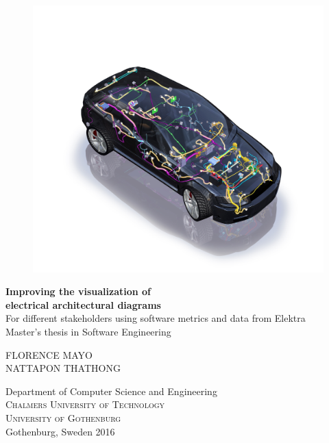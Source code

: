 
\begin{titlepage}
			
\addtolength{\voffset}{2cm}

\begin{figure}[H]
\centering
\vspace{2cm}	%
\includegraphics[width=0.7\linewidth]{figure/cover.jpg}
\end{figure}

\mbox{}
\vfill
\renewcommand{\familydefault}{\sfdefault} \normalfont %
\textbf{{\Huge
Improving the visualization of \\[0.2cm] 
electrical architectural diagrams}} \\[0.5cm]
{\normalfont
For different stakeholders using software metrics and data from Elektra} \\[0.5cm]
Master's thesis in Software Engineering \setlength{\parskip}{1cm}

{\large FLORENCE MAYO} \\[0.2cm]
{\large NATTAPON THATHONG} \setlength{\parskip}{1.5cm}

Department of Computer Science and Engineering \\
\textsc{Chalmers University of Technology} \\
\textsc{University of Gothenburg} \\
Gothenburg, Sweden 2016

\renewcommand{\familydefault}{\rmdefault} \normalfont %
\end{titlepage}


